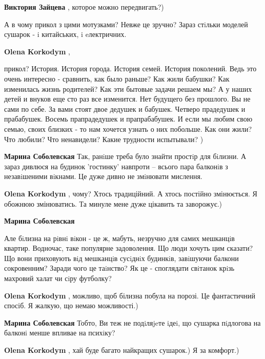 \begin{itemize}
\textbf{Виктория Зайцева} , которое можно передвигать?)


А в чому прикол з цими мотузками? Невже це зручно? Зараз стiльки моделей
сушарок - i китайських, i eлектричних.

\begin{itemize} %
\textbf{Olena Korkodym} , 

прикол? История. История города. История семей. История поколений. Ведь это
очень интересно - сравнить, как было раньше? Как жили бабушки? Как изменилась
жизнь родителей? Как эти бытовые задачи решаем мы? А у наших детей и внуков еще
сто раз все изменится. Нет будущего без прошлого. Вы не сами по себе. За вами
стоят двое дедушек и бабушек. Четверо прадедушек и прабабушек. Восемь
прапрадедушек и прапрабабушек. И если мы любим свою семью, своих близких - то
нам хочется узнать о них побольше. Как они жили? Что любили? Что ненавидели?
Какие трудности испытывали? )

\begin{itemize} %
\textbf{Марина Соболевская} Так, ранiше треба було знайти простiр для бiлизни. А зараз дивлюся на будинок 'гостинку' навпроти -- всього пара балконiв з незавiшеними вiкнами. Це дуже дивно не змiнювати мислення.

\textbf{Olena Korkodym} , чому? Хтось традиційний. А хтось постійно змінюється. Я обожнюю змінюватись. Та минуле мене дуже цікавить та заворожує.)

\textbf{Марина Соболевская} 

Але бiлизна на рiвнi вiкон - це ж, мабуть, незручно для самих мешканцiв
квартир. Водночас, таке популярне задоволення. Що люди хочуть цим сказати? Що
вони приховують вiд мешканцiв сусiднiх будинкiв, завiшуючи балкони сокровенним?
Заради чого це таiнство? Як це - споглядати свiтанок крiзь махровий халат чи
сiру футболку?

\textbf{Olena Korkodym} , можливо, щоб білизна побула на порозі. Це фантастичний спосіб. Я жалкую, що немаю можливості.)

\textbf{Марина Соболевская} Тобто, Ви теж не подiляjeте iдеi, що сушарка пiдлогова на балконi менше впливае на психiку?

\textbf{Olena Korkodym} , хай буде багато найкращих сушарок.) Я за комфорт.)


\end{itemize}
\end{itemize}
\end{itemize}
